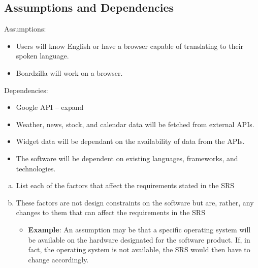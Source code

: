 \documentclass[]{article}
\begin{document}
\subsection{Assumptions and Dependencies}
\label{sub:assumptions_and_dependencies}
Assumptions:
\begin{itemize}
    \item Users will know English or have a browser capable of translating to their spoken language.
    \item Boardzilla will work on a browser.
\end{itemize}
Dependencies:
\begin{itemize}
    \item Google API -- expand
    \item Weather, news, stock, and calendar data will be fetched from external APIs.
    \item Widget data will be dependant on the availability of data from the APIs.
    \item The software will be dependent on existing languages, frameworks, and technologies.
\end{itemize}
\begin{enumerate}[a)]
	\item List each of the factors that affect the requirements stated in the SRS
	\item These factors are not design constraints on the software but are, rather, any changes to them that can affect the requirements in the SRS
	\begin{itemize}
		\item \textbf{Example}: An assumption may be that a specific operating system will be available on the hardware designated for the software product. If, in fact, the operating system is not available, the SRS would then have to change accordingly.
	\end{itemize}
\end{enumerate}
\end{document}
